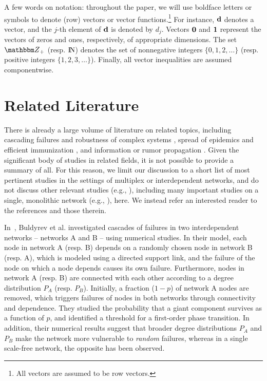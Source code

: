 \documentclass[10pt, journal, compsoc]{IEEEtran}
\newcommand {\bd} {{\bf d}}
\newcommand {\Z} {{\mathbbm Z}}
\newcommand {\N} {{\rm I\kern-1.5pt N}}
\begin{document}
A few words on notation: throughout the paper, we will
use boldface letters or symbols to denote (row) 
vectors or vector functions.\footnote{All vectors 
are assumed to be row vectors.}  For instance, $\bd$ 
denotes a vector, and the $j$-th element of $\bd$ 
is denoted by $d_j$. Vectors ${\bf 0}$ and ${\bf 1}$ 
represent the vectors of zeros and ones, 
respectively, of appropriate dimensions. 
The set $\Z_+$ (resp. $\N$) denotes the set of 
nonnegative integers $\{0, 1, 2, \ldots\}$ (resp. 
positive integers $\{1, 2, 3, \ldots\}$).  Finally, 
all vector inequalities are assumed componentwise. 






\section{Related Literature}
	\label{sec:Related}
	
There is already a large volume of 
literature on related topics, including 
cascading failures and robustness of 
complex systems
\cite{Albert2000, Boguna2003a, Boguna2003b, 
Vesp}, 
spread of epidemics and efficient immunization 
\cite{Pastor2005, Schneider2011, Yagan2012}, 
and information or rumor propagation
\cite{CoupLelarge, Zhuang2016}. 
Given the significant body of studies in related
fields, it is not possible to provide a summary 
of all. For this reason, we limit our discussion 
to a short list of most pertinent studies in 
the settings of multiplex or interdependent
networks, and do not discuss
other relevant studies 
(e.g., \cite{Baxter2012, Brummitt2012, 
Goltsev2008, Lee2014, Moharrami, Son2012}), 
including many important studies on a single, monolithic
network (e.g., \cite{Blume2011, Cohen1, Cohen2, 
CoupLelarge, La_TON, MotterLai, Motter, 
Newman2002, Newman2003, Watts2002}), 
here. We instead refer an interested reader to 
the references and those therein. 

In~\cite{Buldyrev2010}, Buldyrev et al. investigated
cascades of failures in two interdependent 
networks -- networks A and B -- using numerical 
studies. In their model, 
each node in network A (resp. B) depends on a
randomly chosen node in network B (resp. A),
which is modeled using a directed support link, 
and the failure of the node on which a node
depends causes its own failure. Furthermore, 
nodes in network A (resp. B) are connected with
each other according to a degree distribution 
$P_A$ (resp. $P_B$). Initially, a fraction 
($1 - p$) of network A nodes are removed, which 
triggers failures of nodes in both networks
through connectivity and 
dependence. They studied the probability
that a giant component survives as a function of
$p$, and identified a threshold for a first-order
phase transition. In addition, their numerical
results suggest that broader degree 
distributions $P_A$ and $P_B$ make the network
more vulnerable to {\em random} failures, whereas in a
single scale-free network, the opposite has
been observed. 
\end{document}
